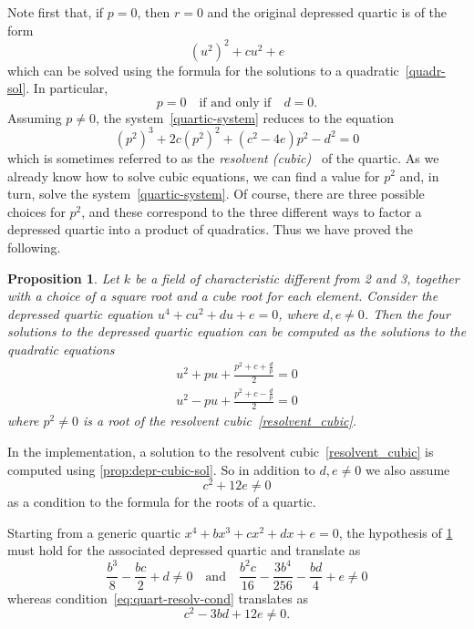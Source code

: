 \documentclass{article} %
\theoremstyle{plain}
\newtheorem{prop}[thm]{Proposition}
\theoremstyle{definition}
\begin{document}
Note first that, if $p=0$, then $r=0$
and the original depressed quartic is of the form
\[
\left(u^2\right)^2 + c u^2 +e
\]
which can be solved using
the formula for the solutions to a quadratic~\eqref{quadr-sol}.
In particular, 
\[
p = 0 \quad \text{if and only if} \quad d=0.
\]
Assuming $p \neq 0$,
the system~\eqref{quartic-system}  reduces to the equation
\begin{equation}\label{resolvent_cubic}
\left(p^2\right)^3 + 2c\left(p^2\right)^2 +\left(c^2 - 4e\right)p^2 - d^2 = 0
\end{equation}
which is sometimes referred to as
the \emph{resolvent (cubic)}~\cite{brookfield_factoring_quartic_polys} of the quartic.
As we already know how to solve cubic equations,
we can find a value for $p^2$ and, in turn, solve the system~\eqref{quartic-system}.
Of course, there are three possible choices for $p^2$,
and these correspond to the three different ways to
factor a depressed quartic into a product of quadratics.
Thus we have proved the following.

\begin{prop}\label{prop:depr-quart-sol}
Let $k$ be a field of characteristic different from 2 and 3,
together with a choice of a square root and a cube root for each element.
Consider the depressed quartic equation $u^4 + cu^2 + du + e = 0$,
where $d,e\neq0$.
Then the four solutions to the depressed quartic equation
can be computed as the solutions to the quadratic equations
\begin{gather*}
u^2+pu+ \frac {p^2 + c + \frac{d}{p}}{2} = 0
\\
u^2 -pu + \frac {p^2 + c - \frac{d}{p}}{2} = 0
\end{gather*}
where $p^2 \neq 0$ is a root of the resolvent cubic~\eqref{resolvent_cubic}.
\end{prop}

In the implementation,
a solution to the resolvent cubic~\eqref{resolvent_cubic}
is computed using \cref{prop:depr-cubic-sol}.
So in addition to $d,e \neq 0$ we also assume
\begin{equation}\label{eq:quart-resolv-cond}
c^2 + 12e \neq 0
\end{equation}
as a condition to the formula for the roots of a quartic.

Starting from a generic quartic $x^4 + bx^3 + cx^2 + dx + e = 0$,
the hypothesis of \cref{prop:depr-quart-sol} must hold for the
associated depressed quartic and translate as
\[
\frac{b^3}{8} - \frac{bc}{2} + d \neq 0
\quad \text{and}\quad
\frac{b^2c}{16} - \frac{3b^4}{256} - \frac{bd}{4} + e \neq 0
\]
whereas condition~\eqref{eq:quart-resolv-cond}
translates as
\[
c^2 - 3bd + 12e \neq 0.
\]
\end{document}
